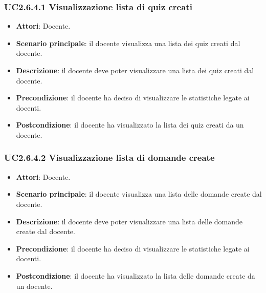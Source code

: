 \subsubsection{UC2.6.4.1 Visualizzazione lista di quiz creati}
\begin{itemize}
\item \textbf{Attori}: Docente.
\item \textbf{Scenario principale}: il docente visualizza una lista dei quiz creati dal docente.
\item \textbf{Descrizione}: il docente deve poter visualizzare una lista dei quiz creati dal docente.
\item \textbf{Precondizione}: il docente ha deciso di visualizzare le statistiche legate ai docenti.
\item \textbf{Postcondizione}: il docente ha visualizzato la lista dei quiz creati da un docente.
\end{itemize}
\subsubsection{UC2.6.4.2 Visualizzazione lista di domande create}
\begin{itemize}
\item \textbf{Attori}: Docente.
\item \textbf{Scenario principale}: il docente visualizza una lista delle domande create dal docente.
\item \textbf{Descrizione}: il docente deve poter visualizzare una lista delle domande create dal docente.
\item \textbf{Precondizione}: il docente ha deciso di visualizzare le statistiche legate ai docenti.
\item \textbf{Postcondizione}: il docente ha visualizzato la lista delle domande create da un docente.
\end{itemize}
